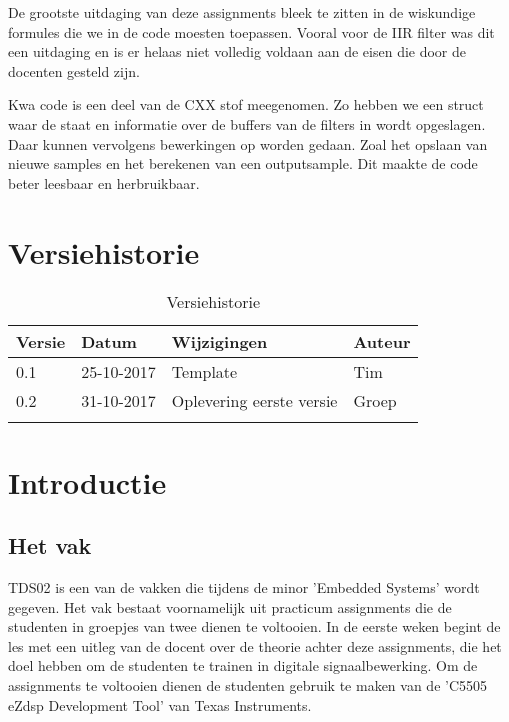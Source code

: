\documentclass[11pt,a4paper]{article}
\begin{document}
De grootste uitdaging van deze assignments bleek te zitten in de wiskundige formules die we in de code moesten toepassen. Vooral voor de IIR filter was dit een uitdaging en is er helaas niet volledig voldaan aan de eisen die door de docenten gesteld zijn. 

Kwa code is een deel van de CXX stof meegenomen. Zo hebben we een struct waar de staat en informatie over de buffers van de filters in wordt opgeslagen. Daar kunnen vervolgens bewerkingen op worden gedaan. Zoal het opslaan van nieuwe samples en het berekenen van een outputsample. Dit maakte de code beter leesbaar en herbruikbaar.
	 
		
	
	\clearpage
	
	\tableofcontents
	
	\clearpage
	
	\listoffigures
	
	\clearpage
	\listoftables
	
	\clearpage
	
	\section{Versiehistorie}
	\begin{table}[H]
		\centering
		\label{Versiehistorie}
		\begin{tabular}{|p{1cm}|p{2cm}|p{6cm}|p{2cm}|}
			\hline
			\rowcolor[HTML]{FFCC67}
			\textbf{Versie} & \textbf{Datum} & \textbf{Wijzigingen} & \textbf{Auteur} \\ \hline
			0.1    & 25-10-2017 & Template    & Tim \\ \hline
			0.2	   & 31-10-2017 & Oplevering eerste versie  & Groep \\ \hline
			&       &             &        \\ \hline
		\end{tabular}
		\caption {Versiehistorie} \label{tab:title} 
	\end{table}	


	\section{Introductie}
		\subsection{Het vak}
		TDS02 is een van de vakken die tijdens de minor 'Embedded Systems' wordt gegeven. Het vak bestaat voornamelijk uit practicum assignments die de studenten in groepjes van twee dienen te voltooien. In de eerste weken begint de les met een uitleg van de docent over de theorie achter deze assignments, die het doel hebben om de studenten te trainen in digitale signaalbewerking. Om de assignments te voltooien dienen de studenten gebruik te maken van de 'C5505 eZdsp Development Tool' van Texas Instruments.
		
\end{document}
